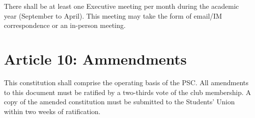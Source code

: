 \documentclass{article}
\begin{document}
There shall be at least one Executive meeting per month during the academic year (September to April). This meeting may take the form of email/IM correspondence or an in-person meeting.

\section{Article 10: Ammendments}

This constitution shall comprise the operating basis of the PSC.
All amendments to this document must be ratified by a two-thirds vote of the club membership.  
A copy of the amended constitution must be submitted to the Students' Union within two weeks of ratification.   
\end{document}
